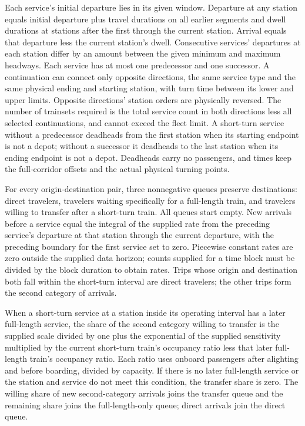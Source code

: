 \documentclass[10pt]{article}
\begin{document}
Each service's initial departure lies in its given window. Departure at any station equals initial departure plus travel durations on all earlier segments and dwell durations at stations after the first through the current station. Arrival equals that departure less the current station's dwell. Consecutive services' departures at each station differ by an amount between the given minimum and maximum headways. Each service has at most one predecessor and one successor. A continuation can connect only opposite directions, the same service type and the same physical ending and starting station, with turn time between its lower and upper limits. Opposite directions' station orders are physically reversed. The number of trainsets required is the total service count in both directions less all selected continuations, and cannot exceed the fleet limit. A short-turn service without a predecessor deadheads from the first station when its starting endpoint is not a depot; without a successor it deadheads to the last station when its ending endpoint is not a depot. Deadheads carry no passengers, and times keep the full-corridor offsets and the actual physical turning points.

For every origin-destination pair, three nonnegative queues preserve destinations: direct travelers, travelers waiting specifically for a full-length train, and travelers willing to transfer after a short-turn train. All queues start empty. New arrivals before a service equal the integral of the supplied rate from the preceding service's departure at that station through the current departure, with the preceding boundary for the first service set to zero. Piecewise constant rates are zero outside the supplied data horizon; counts supplied for a time block must be divided by the block duration to obtain rates. Trips whose origin and destination both fall within the short-turn interval are direct travelers; the other trips form the second category of arrivals.

When a short-turn service at a station inside its operating interval has a later full-length service, the share of the second category willing to transfer is the supplied scale divided by one plus the exponential of the supplied sensitivity multiplied by the current short-turn train's occupancy ratio less that later full-length train's occupancy ratio. Each ratio uses onboard passengers after alighting and before boarding, divided by capacity. If there is no later full-length service or the station and service do not meet this condition, the transfer share is zero. The willing share of new second-category arrivals joins the transfer queue and the remaining share joins the full-length-only queue; direct arrivals join the direct queue.
\end{document}
